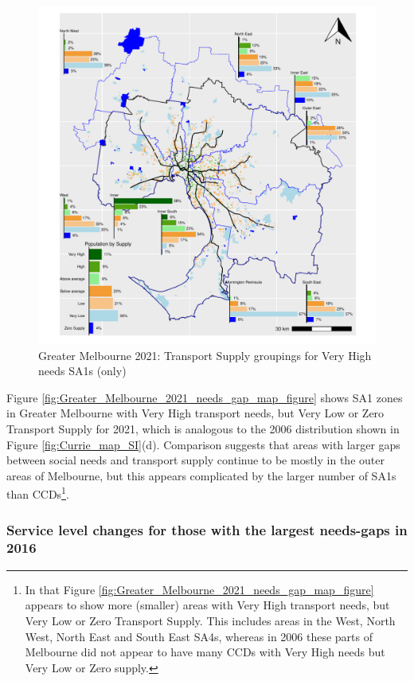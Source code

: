 \documentclass[preprint, 3p,
authoryear]{elsarticle} %
\begin{document}
\begin{figure}
\centering
\includegraphics{ReynoldsCurrieQu2024_files/figure-latex/Greater_Melbourne_2021_needs_gap_map_figure-1.pdf}
\caption{Greater Melbourne 2021: Transport Supply groupings for Very
High needs SA1s (only)}
\end{figure}

Figure \ref{fig:Greater_Melbourne_2021_needs_gap_map_figure} shows SA1
zones in Greater Melbourne with Very High transport needs, but Very Low
or Zero Transport Supply for 2021, which is analogous to the 2006
distribution shown in Figure \ref{fig:Currie_map_SI}(d). Comparison
suggests that areas with larger gaps between social needs and transport
supply continue to be mostly in the outer areas of Melbourne, but this
appears complicated by the larger number of SA1s than CCDs\footnote{In
  that Figure \ref{fig:Greater_Melbourne_2021_needs_gap_map_figure}
  appears to show more (smaller) areas with Very High transport needs,
  but Very Low or Zero Transport Supply. This includes areas in the
  West, North West, North East and South East SA4s, whereas in 2006
  these parts of Melbourne did not appear to have many CCDs with Very
  High needs but Very Low or Zero supply.}.

\subsubsection{Service level changes for those with the largest
needs-gaps in
2016}\label{service-level-changes-for-those-with-the-largest-needs-gaps-in-2016}
\end{document}
